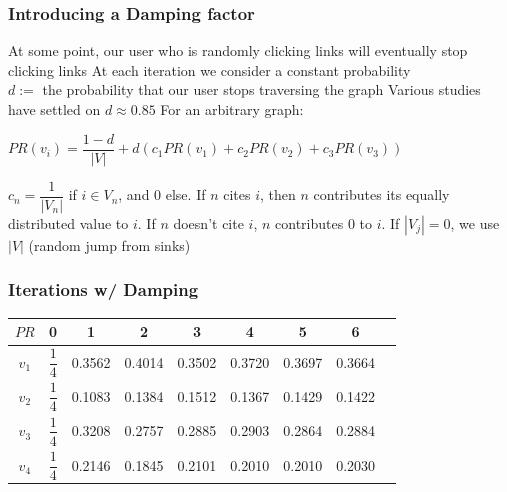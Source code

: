 \documentclass{beamer}
\begin{document}
\begin{frame}[t]
\frametitle{Introducing a Damping factor}
\begin{outline}
    \1 At some point, our user who is randomly clicking links will eventually stop clicking links
    \1 At each iteration we consider a constant probability\\ $d :=$ the probability that our user stops traversing the graph
        \2 Various studies have settled on $d\approx 0.85$
    \1 For an arbitrary graph:
\end{outline}
\begin{mdframed}[backgroundcolor=blue!20]
    \begin{math}
        PR(v_i) = \dfrac{1-d}{|V|} + d(c_1PR(v_1) + c_2PR(v_2) + c_3PR(v_3))
    \end{math}
\end{mdframed}
\begin{outline}
    \1 $c_n = \dfrac{1}{|V_n|}$ if $i \in V_n$, and 0 else. 
        \2 If $n$ cites $i$, then $n$ contributes its equally distributed value to $i$. If $n$ doesn't cite $i$, $n$ contributes 0 to $i$.
    \1 If $|V_j| = 0$, we use $|V|$ (random jump from sinks)
\end{outline}
\end{frame}

\begin{frame}
\frametitle{Iterations w/ Damping}
\bgroup
\def\arraystretch{2.5}
\begin{tabular}{|c|c|c|c|c|c|c|c|c|}
    \hline
    $PR$ & 0 & 1 & 2 & 3 & 4 & 5 & 6 \\%
    \hline
    $v_1$ & $\dfrac{1}{4}$ & 0.3562 & 0.4014 & 0.3502 & 0.3720 & 0.3697 & 0.3664\\%
    $v_2$ & $\dfrac{1}{4}$ & 0.1083 & 0.1384 & 0.1512 & 0.1367 & 0.1429 & 0.1422\\%
    $v_3$ & $\dfrac{1}{4}$ & 0.3208 & 0.2757 & 0.2885 & 0.2903 & 0.2864 & 0.2884\\%
    $v_4$ & $\dfrac{1}{4}$ & 0.2146 & 0.1845 & 0.2101 & 0.2010 & 0.2010 & 0.2030\\%
    \hline
\end{tabular}
\egroup
\end{frame}
\end{document}
